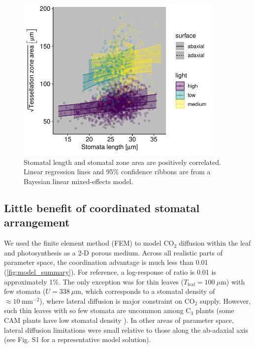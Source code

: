 \documentclass[webpdf,large,modern,unnumsec,namedate]{oup-authoring-template}
\begin{document}
\begin{figure}[ht]
\includegraphics[width = 4in]{figures/length-area.pdf}
\caption{Stomatal length and stomatal zone area are positively correlated. Linear regression lines and 95\% confidence ribbons are from a Bayesian linear mixed-effects model.}
\label{fig:length-area}
\end{figure}

\subsection{Little benefit of coordinated stomatal
arrangement}\label{little-benefit-of-coordinated-stomatal-arrangement}

We used the finite element method (FEM) to model CO\(_2\) diffusion
within the leaf and photosynthesis as a 2-D porous medium. Across all
realistic parts of parameter space, the coordination advantage is much
less than 0.01 (\autoref{fig:model_summary}). For reference, a
log-response of ratio is 0.01 is approximately 1\%. The only exception
was for thin leaves (\(T_\text{leaf} = 100~\mu \text{m}\)) with few
stomata (\(U = 338~\mu \text{m}\), which corresponds to a stomatal
density of \(\approx 10~\text{mm}^{-2}\)), where lateral diffusion is
major constraint on CO\(_2\) supply. However, such thin leaves with so
few stomata are uncommon among C\(_3\) plants (some CAM plants have low
stomatal density \citep{males_stomatal_2017}). In other areas of
parameter space, lateral diffusion limitations were small relative to
those along the ab-adaxial axis (see Fig. S1 for a representative model
solution).
\end{document}

